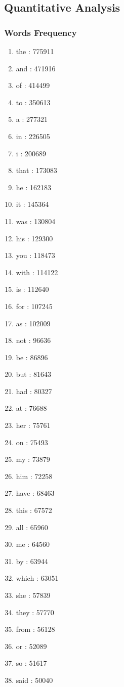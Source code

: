 \documentclass[notes]{beamer}
\begin{document}
\subsection{Quantitative Analysis}
\frame
{
  \frametitle{Words Frequency}
\begin{tiny}
\begin{multicols}{4}
\begin{enumerate}
    \item the : 775911
	\item and : 471916
	\item of : 414499
	\item to : 350613
	\item a : 277321
	\item in : 226505
	\item i : 200689
	\item that : 173083
	\item he : 162183
	\item it : 145364
	\item was : 130804
	\item his : 129300
	\item you : 118473
	\item with : 114122
	\item is : 112640
	\item for : 107245
	\item as : 102009
	\item not : 96636
	\item be : 86896
	\item but : 81643
	\item had : 80327
	\item at : 76688
	\item her : 75761
	\item on : 75493
	\item my : 73879
	\item him : 72258
	\item have : 68463
	\item this : 67572
	\item all : 65960
	\item me : 64560
	\item by : 63944
	\item which : 63051
	\item she : 57839
	\item they : 57770
	\item from : 56128
	\item or : 52089
	\item so : 51617
	\item said : 50040

\end{enumerate}
\end{multicols}
\end{tiny}}
\end{document}
